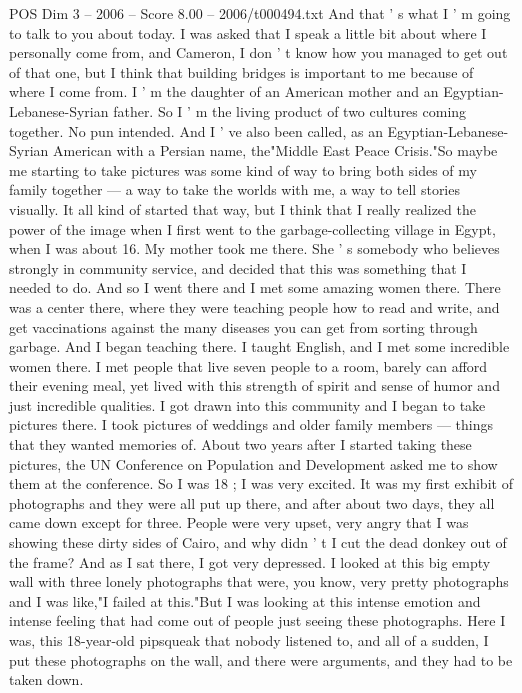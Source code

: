 \begin{textsample}{POS Dim 3 – 2006 – Score 8.00 – 2006/t000494.txt}
And that ' s what I ' m going to talk to you about today.
I was asked that I speak a little bit about where I personally come from, and Cameron, I don ' t know how you managed to get out of that one, but I think that building bridges is important to me because of where I come from.
I ' m the daughter of an American mother and an Egyptian-Lebanese-Syrian father.
So I ' m the living product of two cultures coming together.
No pun intended.
And I ' ve also been called, as an Egyptian-Lebanese-Syrian American with a Persian name, the"Middle East Peace Crisis."So maybe me starting to take pictures was some kind of way to bring both sides of my family together — a way to take the worlds with me, a way to tell stories visually.
It all kind of started that way, but I think that I really realized the power of the image when I first went to the garbage-collecting village in Egypt, when I was about 16.
My mother took me there.
She ' s somebody who believes strongly in community service, and decided that this was something that I needed to do.
And so I went there and I met some amazing women there.
There was a center there, where they were teaching people how to read and write, and get vaccinations against the many diseases you can get from sorting through garbage.
And I began teaching there.
I taught English, and I met some incredible women there.
I met people that live seven people to a room, barely can afford their evening meal, yet lived with this strength of spirit and sense of humor and just incredible qualities.
I got drawn into this community and I began to take pictures there.
I took pictures of weddings and older family members — things that they wanted memories of.
About two years after I started taking these pictures, the UN Conference on Population and Development asked me to show them at the conference.
So I was 18 ; I was very excited.
It was my first exhibit of photographs and they were all put up there, and after about two days, they all came down except for three.
People were very upset, very angry that I was showing these dirty sides of Cairo, and why didn ' t I cut the dead donkey out of the frame?
And as I sat there, I got very depressed.
I looked at this big empty wall with three lonely photographs that were, you know, very pretty photographs and I was like,"I failed at this."But I was looking at this intense emotion and intense feeling that had come out of people just seeing these photographs.
Here I was, this 18-year-old pipsqueak that nobody listened to, and all of a sudden, I put these photographs on the wall, and there were arguments, and they had to be taken down.

\end{textsample}
